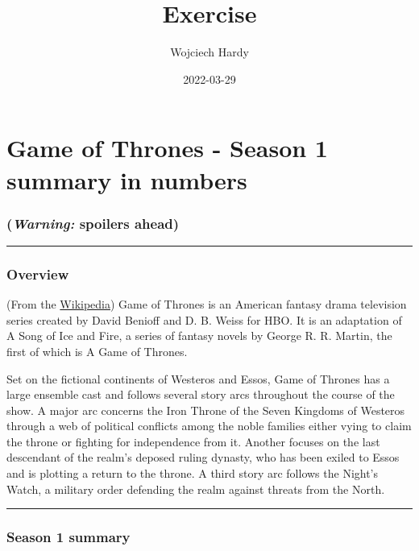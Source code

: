 \documentclass[
  letterpaper,
  DIV=11,
  numbers=noendperiod]{scrartcl}
\title{Exercise}
\author{Wojciech Hardy}
\date{2022-03-29}
\begin{document}
\maketitle


\section{Game of Thrones - Season 1 summary in
numbers}\label{game-of-thrones---season-1-summary-in-numbers}

\subsubsection{\texorpdfstring{\textbf{(\emph{Warning:} spoilers
ahead)}}{(Warning: spoilers ahead)}}\label{warning-spoilers-ahead}

\begin{center}\rule{0.5\linewidth}{0.5pt}\end{center}

\subsubsection{Overview}\label{overview}

(From the
\href{https://en.wikipedia.org/wiki/Game_of_Thrones\#Premise}{Wikipedia})
Game of Thrones is an American fantasy drama television series created
by David Benioff and D. B. Weiss for HBO. It is an adaptation of A Song
of Ice and Fire, a series of fantasy novels by George R. R. Martin, the
first of which is A Game of Thrones.

Set on the fictional continents of Westeros and Essos, Game of Thrones
has a large ensemble cast and follows several story arcs throughout the
course of the show. A major arc concerns the Iron Throne of the Seven
Kingdoms of Westeros through a web of political conflicts among the
noble families either vying to claim the throne or fighting for
independence from it. Another focuses on the last descendant of the
realm's deposed ruling dynasty, who has been exiled to Essos and is
plotting a return to the throne. A third story arc follows the Night's
Watch, a military order defending the realm against threats from the
North.

\begin{center}\rule{0.5\linewidth}{0.5pt}\end{center}

\subsubsection{Season 1 summary}\label{season-1-summary}
\end{document}
